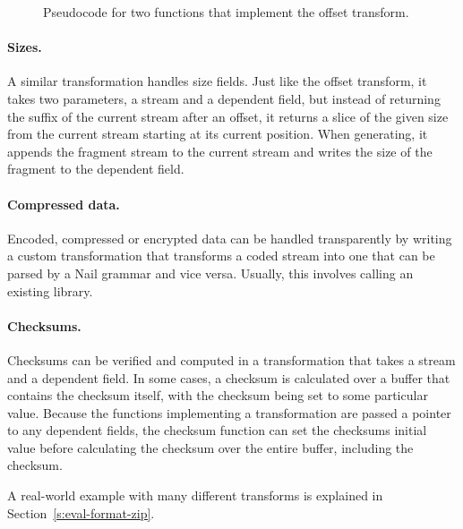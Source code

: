 \begin{figure}[h]
\smaller[0.5]

\caption{Pseudocode for two functions that implement the offset transform.}
\label{fig:xform-sig}
\end{figure}


\paragraph{Sizes.}
A similar transformation handles size fields. Just like the offset transform, it takes two parameters, a
stream and a dependent field, but instead of returning the suffix of the current stream after an
offset, it returns a slice of the given size from the current stream starting at its current
position. When generating, it appends the fragment stream to the current stream and writes the size
of the fragment to the dependent field.

\paragraph{Compressed data.}
Encoded, compressed or encrypted data can be handled transparently by writing a custom
transformation that transforms a coded stream into one that can be parsed by a Nail grammar and vice
versa. Usually, this involves calling an existing library.

\paragraph{Checksums.}
Checksums can be verified and computed in a transformation that takes a stream and a dependent
field. In some cases, a checksum is calculated over a buffer that contains the checksum itself, with
the checksum being set to some particular value. Because the functions implementing a transformation
are passed a pointer to any dependent fields, the checksum function can set the checksums initial
value before calculating the checksum over the entire buffer, including the checksum.


\noindent A real-world example with many different transforms is explained in Section~\ref{s:eval-format-zip}.
 






